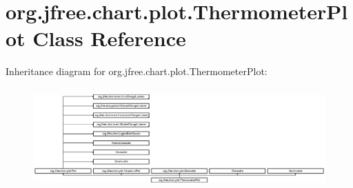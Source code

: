 \hypertarget{classorg_1_1jfree_1_1chart_1_1plot_1_1_thermometer_plot}{}\section{org.\+jfree.\+chart.\+plot.\+Thermometer\+Plot Class Reference}
\label{classorg_1_1jfree_1_1chart_1_1plot_1_1_thermometer_plot}
Inheritance diagram for org.\+jfree.\+chart.\+plot.\+Thermometer\+Plot\+:\begin{figure}[H]
\begin{center}
\leavevmode
\includegraphics[height=3.862069cm]{classorg_1_1jfree_1_1chart_1_1plot_1_1_thermometer_plot}
\end{center}
\end{figure}
